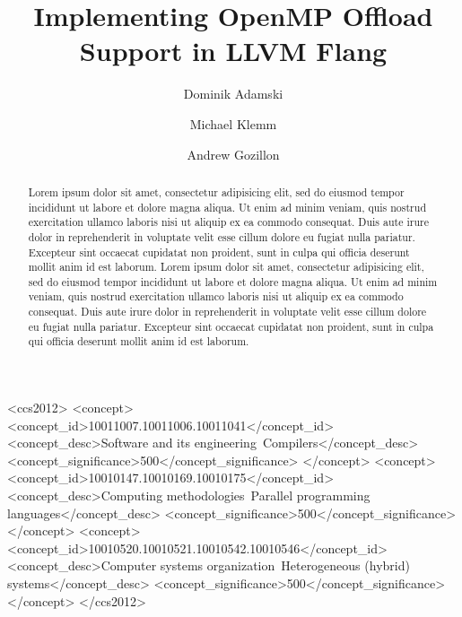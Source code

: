 \documentclass[acmtog,natbib=false]{acmart}
\begin{document}
\title{Implementing OpenMP Offload Support in LLVM Flang}

\author{Dominik Adamski}
\orcid{}

\author{Michael Klemm}

\author{Andrew Gozillon}

\renewcommand{\shortauthors}{Adamski et al.}

\begin{abstract}
Lorem ipsum dolor sit amet, consectetur adipisicing elit, sed do eiusmod
tempor incididunt ut labore et dolore magna aliqua. Ut enim ad minim veniam,
quis nostrud exercitation ullamco laboris nisi ut aliquip ex ea commodo
consequat. Duis aute irure dolor in reprehenderit in voluptate velit esse
cillum dolore eu fugiat nulla pariatur. Excepteur sint occaecat cupidatat non
proident, sunt in culpa qui officia deserunt mollit anim id est laborum.
Lorem ipsum dolor sit amet, consectetur adipisicing elit, sed do eiusmod
tempor incididunt ut labore et dolore magna aliqua. Ut enim ad minim veniam,
quis nostrud exercitation ullamco laboris nisi ut aliquip ex ea commodo
consequat. Duis aute irure dolor in reprehenderit in voluptate velit esse
cillum dolore eu fugiat nulla pariatur. Excepteur sint occaecat cupidatat non
proident, sunt in culpa qui officia deserunt mollit anim id est laborum.
\end{abstract}

\begin{CCSXML}
<ccs2012>
   <concept>
       <concept_id>10011007.10011006.10011041</concept_id>
       <concept_desc>Software and its engineering~Compilers</concept_desc>
       <concept_significance>500</concept_significance>
       </concept>
   <concept>
       <concept_id>10010147.10010169.10010175</concept_id>
       <concept_desc>Computing methodologies~Parallel programming languages</concept_desc>
       <concept_significance>500</concept_significance>
       </concept>
   <concept>
       <concept_id>10010520.10010521.10010542.10010546</concept_id>
       <concept_desc>Computer systems organization~Heterogeneous (hybrid) systems</concept_desc>
       <concept_significance>500</concept_significance>
       </concept>
 </ccs2012>
\end{CCSXML}
\end{document}
